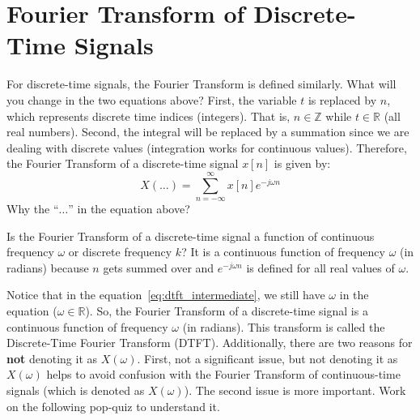 \section{Fourier Transform of Discrete-Time Signals}
For discrete-time signals, the Fourier Transform is defined similarly. What will you change in the two equations above? First, the variable \( t \) is replaced by \( n \), which represents discrete time indices (integers). That is, $n \in \mathbb{Z}$ while $t \in \mathbb{R}$ (all real numbers). Second, the integral will be replaced by a summation since we are dealing with discrete values (integration works for continuous values). Therefore, the Fourier Transform of a discrete-time signal \( x[n] \) is given by:
\begin{equation}
    \label{eq:dtft_intermediate}
    X(\dots) = \sum_{n=-\infty}^{\infty} x[n] e^{-j \omega n}
\end{equation}
Why the ``$\dots$'' in the equation above? 
\begin{popquiz}
    Is the Fourier Transform of a discrete-time signal a function of continuous frequency $\omega$ or discrete frequency $k$?
    \popqsplit 
    It is a continuous function of frequency $\omega$ (in radians) because $n$ gets summed over and $e^{-j \omega n}$ is defined for all real values of $\omega$.
\end{popquiz}
Notice that in the equation~\eqref{eq:dtft_intermediate}, we still have $\omega$ in the equation ($\omega \in \mathbb{R}$). So, the Fourier Transform of a discrete-time signal is a continuous function of frequency $\omega$ (in radians). This transform is called the Discrete-Time Fourier Transform (DTFT). Additionally, there are two reasons for \textbf{not} denoting it as $X(\omega)$. First, not a significant issue, but not denoting it as $X(\omega)$ helps to avoid confusion with the Fourier Transform of continuous-time signals (which is denoted as $X(\omega)$). 
The second issue is more important. Work on the following pop-quiz to understand it.
